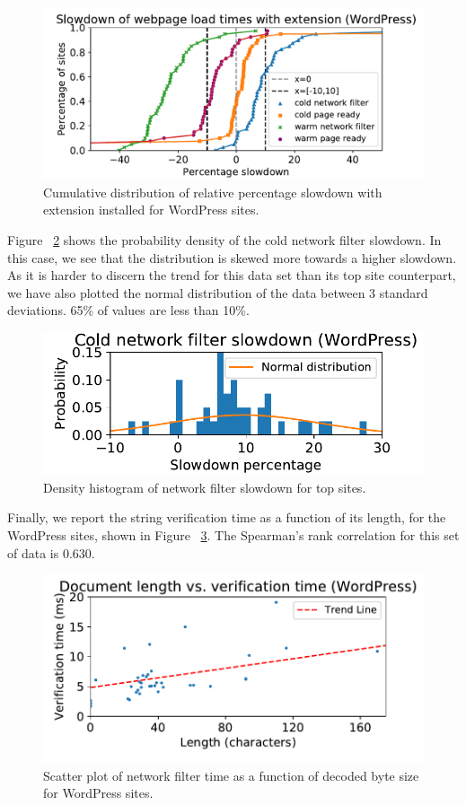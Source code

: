 \begin{figure}[h]
	\includegraphics[scale=0.5]{results/extension_slowdown_wordpress_small.pdf}
	\caption{Cumulative distribution of relative percentage slowdown with extension installed for WordPress sites.}
	\label{fig:wordpress_slowdown}
\end{figure}

Figure ~\ref{fig:histogram_slowdown_wordpress} shows the probability density of the cold network filter slowdown. In this case, we see that the distribution is skewed more towards a higher slowdown. As it is harder to discern the trend for this data set than its top site counterpart, we have also plotted the normal distribution of the data between 3 standard deviations. 65\% of values are less than 10\%.

\begin{figure}[h]
	\includegraphics[scale=0.5]{results/density_histogram_filter_slowdown_wordpress_small.pdf}
	\caption{Density histogram of network filter slowdown for top sites.}
	\label{fig:histogram_slowdown_wordpress}
\end{figure}

Finally, we report the string verification time as a function of its length, for the WordPress sites, shown in Figure ~\ref{fig:verification_time_string_length_wordpress}. The Spearman's rank correlation for this set of data is 0.630. 

\begin{figure}[h]
	\includegraphics[scale=0.5]{results/string_length_vs_verification_time_wordpress_small.pdf}
	\caption{Scatter plot of network filter time as a function of decoded byte size for WordPress sites.}
	\label{fig:verification_time_string_length_wordpress}
\end{figure}